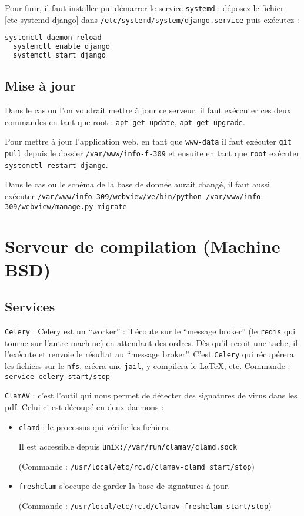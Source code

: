 \documentclass[10pt,a4paper]{article}
\begin{document}
Pour finir, il faut installer pui démarrer le service \texttt{systemd} :
déposez le fichier \ref{etc-systemd-django} dans \texttt{/etc/systemd/system/django.service} puis exécutez :
\begin{lstlisting}[language=bash]
  systemctl daemon-reload
  systemctl enable django
  systemctl start django
\end{lstlisting}


\subsection{Mise à jour}

Dans le cas ou l'on voudrait mettre à jour ce serveur,
il faut exéccuter ces deux commandes en tant que root :
\texttt{apt-get update}, \texttt{apt-get upgrade}.

Pour mettre à jour l'application web, en tant que \texttt{www-data}
il faut exécuter \texttt{git pull} depuis le dossier \texttt{/var/www/info-f-309}
et ensuite en tant que \texttt{root} exécuter \texttt{systemctl restart django}.

Dans le cas ou le schéma de la base de donnée aurait changé,
il faut aussi exécuter \texttt{/var/www/info-309/webview/ve/bin/python /var/www/info-309/webview/manage.py migrate}

\section{Serveur de compilation (Machine BSD)}
\subsection{Services}

\texttt{Celery} : Celery est un ``worker'' : il écoute sur le ``message broker'' (le \texttt{redis} qui tourne sur l'autre machine) en attendant des ordres.
Dès qu'il recoit une tache, il l'exécute et renvoie le résultat au ``message broker''.
C'est \texttt{Celery} qui récupérera les fichiers sur le \texttt{nfs}, créera une \texttt{jail}, y compilera le \LaTeX, etc.
Commande : \texttt{service celery start/stop}

\texttt{ClamAV} : c'est l'outil qui nous permet de détecter des signatures de virus dans les pdf.
Celui-ci est découpé en deux daemons :
        \begin{itemize}
            \item \texttt{clamd} : le processus qui vérifie les fichiers.

            Il est accessible depuis \texttt{unix://var/run/clamav/clamd.sock}

            (Commande : \texttt{/usr/local/etc/rc.d/clamav-clamd start/stop})
            \item \texttt{freshclam} s'occupe de garder la base de signatures à jour.

            (Commande : \texttt{/usr/local/etc/rc.d/clamav-freshclam start/stop})
        \end{itemize}
\end{document}
